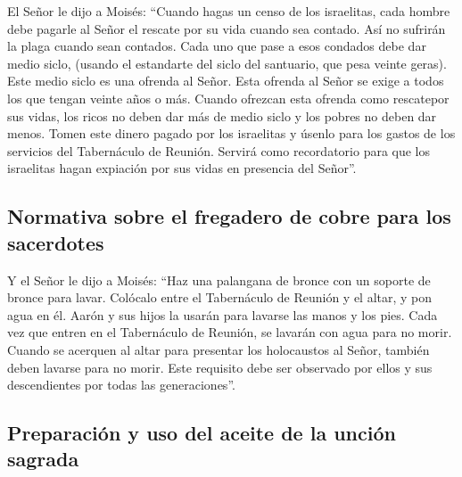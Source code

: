  El Señor le dijo a Moisés:  ``Cuando
hagas un censo de los israelitas, cada hombre debe pagarle al Señor el
rescate por su vida cuando sea contado. Así no sufrirán la plaga cuando
sean contados.  Cada uno que pase a esos condados debe
dar medio siclo, (usando el estandarte del siclo del santuario, que pesa
veinte geras). Este medio siclo es una ofrenda al Señor. 
Esta ofrenda al Señor se exige a todos los que tengan veinte años o más.
 Cuando ofrezcan esta ofrenda como rescatepor sus vidas,
los ricos no deben dar más de medio siclo y los pobres no deben dar
menos.  Tomen este dinero pagado por los israelitas y
úsenlo para los gastos de los servicios del Tabernáculo de Reunión.
Servirá como recordatorio para que los israelitas hagan expiación por
sus vidas en presencia del Señor''.

\hypertarget{normativa-sobre-el-fregadero-de-cobre-para-los-sacerdotes}{%
\subsection{Normativa sobre el fregadero de cobre para los
sacerdotes}\label{normativa-sobre-el-fregadero-de-cobre-para-los-sacerdotes}}

 Y el Señor le dijo a Moisés:  ``Haz una
palangana de bronce con un soporte de bronce para lavar. Colócalo entre
el Tabernáculo de Reunión y el altar, y pon agua en él. 
Aarón y sus hijos la usarán para lavarse las manos y los pies.
 Cada vez que entren en el Tabernáculo de Reunión, se
lavarán con agua para no morir. Cuando se acerquen al altar para
presentar los holocaustos al Señor,  también deben
lavarse para no morir. Este requisito debe ser observado por ellos y sus
descendientes por todas las generaciones''.

\hypertarget{preparaciuxf3n-y-uso-del-aceite-de-la-unciuxf3n-sagrada}{%
\subsection{Preparación y uso del aceite de la unción
sagrada}\label{preparaciuxf3n-y-uso-del-aceite-de-la-unciuxf3n-sagrada}}

